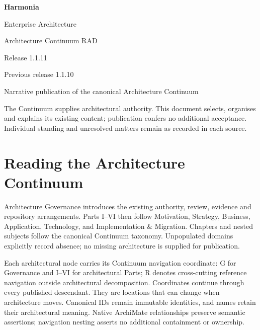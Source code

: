 \documentclass[10pt,a4paper,oneside,headings=small]{scrreprt}
\begin{document}
\hypersetup{pageanchor=false}
\begin{titlepage}
\vspace*{24mm}
{\Huge\bfseries\color{Ink} Harmonia\par}
\vspace{8mm}
{\LARGE Enterprise Architecture\par Architecture Continuum RAD\par}
\vspace{12mm}
{\Large Release 1.1.11\par Previous release 1.1.10\par}
\vfill
Narrative publication of the canonical Architecture Continuum\par
\vspace{8mm}
The Continuum supplies architectural authority. This document selects, organises
and explains its existing content; publication confers no additional acceptance.
Individual standing and unresolved matters remain as recorded in each source.
\end{titlepage}
\hypersetup{pageanchor=true}
\tableofcontents
\chapter*{Reading the Architecture Continuum}
Architecture Governance introduces the existing authority, review, evidence and
repository arrangements. Parts I--VI then follow Motivation, Strategy, Business,
Application, Technology, and Implementation \& Migration. Chapters and nested
subjects follow the canonical Continuum taxonomy. Unpopulated domains explicitly
record absence; no missing architecture is supplied for publication.

Each architectural node carries its Continuum navigation coordinate: G for
Governance and I--VI for architectural Parts; R denotes cross-cutting reference
navigation outside architectural decomposition. Coordinates continue through every
published descendant. They are locations that can change when architecture moves.
Canonical IDs remain immutable identities, and names retain their architectural
meaning. Native ArchiMate relationships preserve semantic assertions; navigation
nesting asserts no additional containment or ownership.
\end{document}
